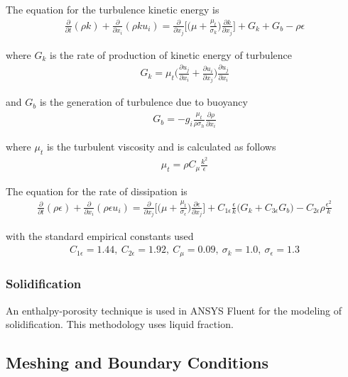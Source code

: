 \documentclass[onehalf,11pt]{beavtex}
\begin{document}
The equation for the turbulence kinetic energy is 
\begin{align}
	\frac{\partial}{\partial t} (\rho k) + \frac{\partial}{\partial x_i} (\rho k u_i) = \frac{\partial}{\partial x_j} \Big[ \Big( \mu + \frac{\mu_t}{\sigma_k}\Big) \frac{\partial k}{\partial x_j} \Big] + G_k + G_b - \rho \epsilon 
\end{align}

where $G_k$ is the rate of production of kinetic energy of turbulence
\begin{align}
	G_k = \mu_t \Big( \frac{\partial u_j}{\partial x_i} + \frac{\partial u_i}{\partial x_j} \Big) \frac{\partial u_j}{\partial x_i}
\end{align}

and $G_b$ is the generation of turbulence due to buoyancy
\begin{align}
	G_b = -g_i \frac{\mu_t}{\rho \sigma_h} \frac{\partial \rho}{\partial x_i}
\end{align}

where $\mu_t$ is the turbulent viscosity and is calculated as follows
\begin{align}
	\mu_t = \rho C_{\mu} \frac{k^2}{\epsilon}
\end{align}	

The equation for the rate of dissipation is
\begin{align}
	\frac{\partial}{\partial t} (\rho \epsilon) + \frac{\partial}{\partial x_i} (\rho \epsilon u_i) = \frac{\partial}{\partial x_j} \Big[ \Big( \mu + \frac{\mu_t}{\sigma_{\epsilon}}\Big) \frac{\partial \epsilon}{\partial x_j} \Big] + C_{1\epsilon}\frac{\epsilon}{k}\Big(G_k + C_{3\epsilon}G_b\Big) - C_{2\epsilon}\rho\frac{\epsilon^2}{k} 
\end{align}

with the standard empirical constants used
\begin{align}
	C_{1\epsilon} = 1.44, \ C_{2\epsilon} = 1.92,\ C_{\mu} = 0.09,\ \sigma_{k} = 1.0,\ \sigma_{\epsilon} = 1.3
\end{align} 

\subsubsection{Solidification}

An enthalpy-porosity technique is used in ANSYS Fluent for the modeling of solidification. 
This methodology uses liquid fraction.

\subsection{Meshing and Boundary Conditions}
\end{document}

